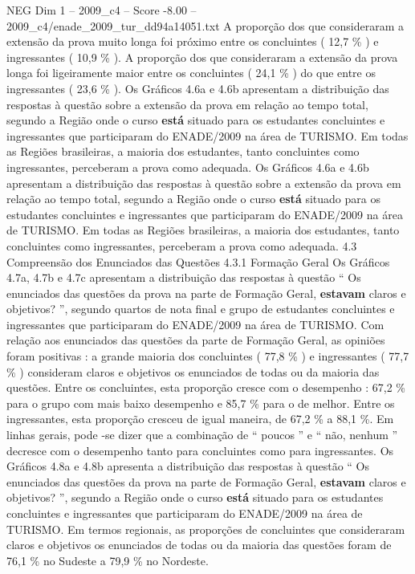 \begin{textsample}{NEG Dim 1 – 2009\_c4 – Score -8.00 – 2009\_c4/enade\_2009\_tur\_dd94a14051.txt}
A proporção dos que consideraram a extensão da prova muito longa foi próximo entre os concluintes ( 12,7 \% ) e ingressantes ( 10,9 \% ).
A proporção dos que consideraram a extensão da prova longa foi ligeiramente maior entre os concluintes ( 24,1 \% ) do que entre os ingressantes ( 23,6 \% ).
Os Gráficos 4.6a e 4.6b apresentam a distribuição das respostas à questão sobre a extensão da prova em relação ao tempo total, segundo a Região onde o curso \textbf{está} situado para os estudantes concluintes e ingressantes que participaram do ENADE/2009 na área de TURISMO.
Em todas as Regiões brasileiras, a maioria dos estudantes, tanto concluintes como ingressantes, perceberam a prova como adequada.
Os Gráficos 4.6a e 4.6b apresentam a distribuição das respostas à questão sobre a extensão da prova em relação ao tempo total, segundo a Região onde o curso \textbf{está} situado para os estudantes concluintes e ingressantes que participaram do ENADE/2009 na área de TURISMO.
Em todas as Regiões brasileiras, a maioria dos estudantes, tanto concluintes como ingressantes, perceberam a prova como adequada. 4.3 Compreensão dos Enunciados das Questões 4.3.1 Formação Geral Os Gráficos 4.7a, 4.7b e 4.7c apresentam a distribuição das respostas à questão “ Os enunciados das questões da prova na parte de Formação Geral, \textbf{estavam} claros e objetivos? ”, segundo quartos de nota final e grupo de estudantes concluintes e ingressantes que participaram do ENADE/2009 na área de TURISMO.
Com relação aos enunciados das questões da parte de Formação Geral, as opiniões foram positivas : a grande maioria dos concluintes ( 77,8 \% ) e ingressantes ( 77,7 \% ) consideram claros e objetivos os enunciados de todas ou da maioria das questões.
Entre os concluintes, esta proporção cresce com o desempenho : 67,2 \% para o grupo com mais baixo desempenho e 85,7 \% para o de melhor.
Entre os ingressantes, esta proporção cresceu de igual maneira, de 67,2 \% a 88,1 \%.
Em linhas gerais, pode -se dizer que a combinação de “ poucos ” e “ não, nenhum ” decresce com o desempenho tanto para concluintes como para ingressantes.
Os Gráficos 4.8a e 4.8b apresenta a distribuição das respostas à questão “ Os enunciados das questões da prova na parte de Formação Geral, \textbf{estavam} claros e objetivos? ”, segundo a Região onde o curso \textbf{está} situado para os estudantes concluintes e ingressantes que participaram do ENADE/2009 na área de TURISMO.
Em termos regionais, as proporções de concluintes que consideraram claros e objetivos os enunciados de todas ou da maioria das questões foram de 76,1 \% no Sudeste a 79,9 \% no Nordeste.

\end{textsample}
